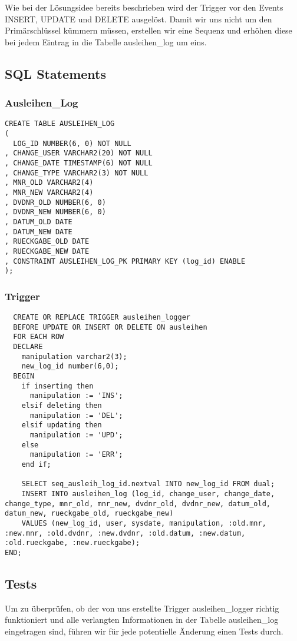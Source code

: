 \documentclass[11pt,a4paper,parskip=half]{scrartcl}
\begin{document}
Wie bei der Lösungsidee bereits beschrieben wird der Trigger vor den Events INSERT, UPDATE und DELETE ausgelöst.
Damit wir uns nicht um den Primärschlüssel kümmern müssen, erstellen wir eine Sequenz und erhöhen diese bei jedem Eintrag in die Tabelle  ausleihen\_log um eins.


\subsection{SQL Statements}
\subsubsection{Ausleihen\_Log}
\begin{lstlisting}
CREATE TABLE AUSLEIHEN_LOG
(
  LOG_ID NUMBER(6, 0) NOT NULL 
, CHANGE_USER VARCHAR2(20) NOT NULL 
, CHANGE_DATE TIMESTAMP(6) NOT NULL 
, CHANGE_TYPE VARCHAR2(3) NOT NULL
, MNR_OLD VARCHAR2(4)
, MNR_NEW VARCHAR2(4)
, DVDNR_OLD NUMBER(6, 0)
, DVDNR_NEW NUMBER(6, 0)
, DATUM_OLD DATE
, DATUM_NEW DATE
, RUECKGABE_OLD DATE 
, RUECKGABE_NEW DATE 
, CONSTRAINT AUSLEIHEN_LOG_PK PRIMARY KEY (log_id) ENABLE 
);
\end{lstlisting}

\subsubsection{Trigger}
\begin{lstlisting}
  CREATE OR REPLACE TRIGGER ausleihen_logger 
  BEFORE UPDATE OR INSERT OR DELETE ON ausleihen
  FOR EACH ROW
  DECLARE
    manipulation varchar2(3);
    new_log_id number(6,0);
  BEGIN
    if inserting then
      manipulation := 'INS';
    elsif deleting then
      manipulation := 'DEL';
    elsif updating then
      manipulation := 'UPD';
    else 
      manipulation := 'ERR';
    end if;
    
    SELECT seq_ausleih_log_id.nextval INTO new_log_id FROM dual; 
    INSERT INTO ausleihen_log (log_id, change_user, change_date, change_type, mnr_old, mnr_new, dvdnr_old, dvdnr_new, datum_old, datum_new, rueckgabe_old, rueckgabe_new) 
    VALUES (new_log_id, user, sysdate, manipulation, :old.mnr, :new.mnr, :old.dvdnr, :new.dvdnr, :old.datum, :new.datum, :old.rueckgabe, :new.rueckgabe);
END;
\end{lstlisting}

\subsection{Tests}
Um zu überprüfen, ob der von uns erstellte Trigger ausleihen\_logger richtig funktioniert und alle verlangten Informationen in der Tabelle ausleihen\_log eingetragen sind, führen wir für jede potentielle Änderung einen Tests durch.
\end{document}
